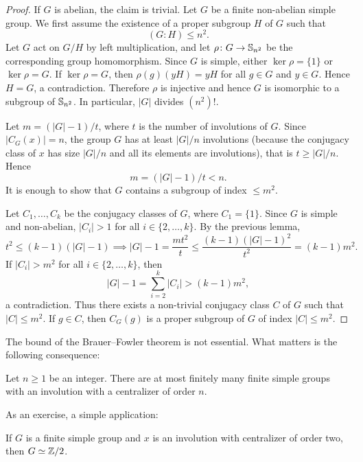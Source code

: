 \begin{proof}
    If $G$ is abelian, the claim is trivial. Let $G$ be a finite non-abelian simple group.
    We first assume the existence of a proper subgroup $H$ of $G$ 
    such that 
    \[
    (G:H)\leq n^2.
    \]
    Let $G$ act on $G/H$ 
    by left multiplication, and let 
    $\rho\colon G\to\mathbb{S}_{n^2}$ be the corresponding
    group homomorphism. Since $G$ is simple, either 
    $\ker\rho=\{1\}$ or $\ker\rho=G$. If $\ker\rho=G$, then
    $\rho(g)(yH)=yH$ for all $g\in G$ and $y\in G$. 
    Hence $H=G$, a contradiction. Therefore $\rho$ is injective
    and hence $G$ is isomorphic to a subgroup of $\mathbb{S}_{n^2}$. 
    In particular, $|G|$ divides $(n^2)!$. 

    Let $m=(|G|-1)/t$, where $t$ is the number of involutions of $G$. 
    Since $|C_G(x)|=n$, the group $G$ has at least $|G|/n$ involutions (because
    the conjugacy class of $x$ has size $|G|/n$ and all its elements are involutions), 
    that is $t\geq |G|/n$. Hence 
    \[
    m=(|G|-1)/t<n.
    \]
    It is enough to show that
    $G$ contains a subgroup of index $\leq m^2$. 

    Let $C_1,\dots,C_k$ be the conjugacy classes of $G$, where $C_1=\{1\}$. 
    Since $G$ is simple and non-abelian, $|C_i|>1$ 
    for all $i\in\{2,\dots,k\}$. By the previous lemma, 
    \[
    t^2\leq(k-1)(|G|-1)\implies |G|-1=\frac{mt^2}{t}\leq\frac{(k-1)(|G|-1)^2}{t^2}=(k-1)m^2.
    \]
    If $|C_i|>m^2$ for all $i\in\{2,\dots,k\}$, then
    \[
    |G|-1=\sum_{i=2}^k|C_i|>(k-1)m^2,
    \]
    a contradiction. Thus there exists a non-trivial conjugacy class
    $C$ of $G$ such that $|C|\leq m^2$. If $g\in C$, then
    $C_G(g)$ is a proper subgroup of $G$ of index $|C|\leq m^2$.
\end{proof}

The bound of the Brauer--Fowler theorem is not essential.
What matters is the following consequence:

\begin{corollary}
    Let $n\geq 1$ be an integer. There are at most finitely many 
    finite simple groups with an involution with a centralizer of order $n$.
\end{corollary}

As an exercise, a simple application: 

\begin{exercise}
    If $G$ is a finite simple group and $x$ is an involution with
    centralizer of order two, then  
    $G\simeq\mathbb{Z}/2$. 
\end{exercise}

